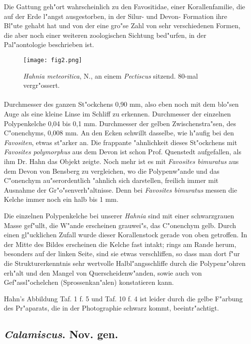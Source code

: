 \documentclass[a4paper, 11pt, oneside]{article}
\begin{document}
Die Gattung geh"ort wahrscheinlich zu den Favositidae, einer Korallenfamilie, die auf der Erde l"angst ausgestorben, in der Silur- und Devon- Formation ihre Bl"ute gehabt hat und von der eine gro"se Zahl von sehr verschiedenen Formen, die aber noch einer weiteren zoologischen Sichtung bed"urfen, in der Pal"aontologie beschrieben ist.
\begin{figure}[H]
\centering
\texttt{[image: fig2.png]}
\caption{\emph{Hahnia meteoritica}, N., an einem \emph{Pectiscus} sitzend. 80-mal vergr"ossert.}
\end{figure}
\paragraph{}
Durchmesser des ganzen St"ockchens 0,90 mm, also eben noch mit dem blo"sen Auge als eine kleine Linse im Schliff zu erkennen. Durchmesser der einzelnen Polypenkelche 0,04 bis 0,1 mm. Durchmesser der gelben Zwischenstra"sen, des C"onenchyms, 0,008 mm. An den Ecken schwillt dasselbe, wie h"aufig bei den \emph{Favositen}, etwas st"arker an. Die frappante "ahnlichkeit dieses St"ockchens mit \emph{Favosites polymorphus} aus dem Devon ist schon Prof. Quenstedt aufgefallen, als ihm Dr. Hahn das Objekt zeigte. Noch mehr ist es mit \emph{Favosites bimuratus} aus dem Devon von Bensberg zu vergleichen, wo die Polypenw"ande und das C"onenchym au"serordentlich "ahnlich sich darstellen, freilich immer mit Ausnahme der Gr"o"senverh"altnisse. Denn bei \emph{Favosites bimuratus} messen die Kelche immer noch ein halb bis 1 mm.

Die einzelnen Polypenkelche bei unserer \emph{Hahnia} sind mit einer schwarzgrauen Masse gef"ullt, die W"ande erscheinen grauwei"s, das C"onenchym gelb. Durch einen gl"ucklichen Zufall wurde dieser Korallenstock gerade von oben getroffen. In der Mitte des Bildes erscheinen die Kelche fast intakt; rings am Rande herum, besonders auf der linken Seite, sind sie etwas verschliffen, so dass man dort f"ur die Strukturerkenntnis sehr wertvolle Halbl"angsschliffe durch die Polypenr"ohren erh"alt und den Mangel von Querscheidenw"anden, sowie auch von Gef"assl"ochelchen (Sprossenkan"alen) konstatieren kann.

Hahn's Abbildung Taf. 1 f. 5 und Taf. 10 f. 4 ist leider durch die gelbe F"arbung des Pr"aparats, die in der Photographie schwarz kommt, beeintr"achtigt.
\subsection{\emph{Calamiscus}. Nov. gen.}
\end{document}
